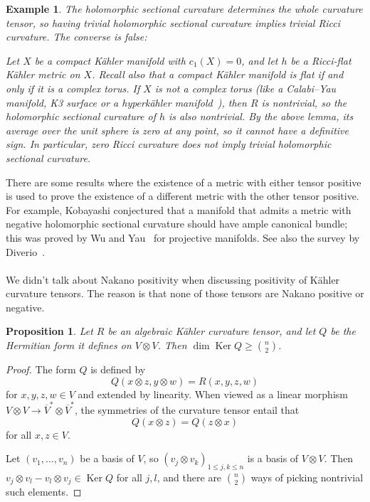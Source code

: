 \documentclass[10pt,a4paper]{article}
\newtheorem{prop}[theo]{Proposition}
\newtheorem{exam}[theo]{Example}
\newtheorem*{proof}{Proof}
\DeclareMathOperator{\Ker}{Ker}
\begin{document}
\begin{exam}
The holomorphic sectional curvature determines the whole curvature tensor, so having trivial holomorphic sectional curvature implies trivial Ricci curvature. The converse is false:

Let $X$ be a compact K\"ahler manifold with $c_1(X) = 0$, and let $h$ be a Ricci-flat K\"ahler metric on $X$. Recall also that a compact K\"ahler manifold is flat if and only if it is a complex torus. If $X$ is not a complex torus (like a Calabi--Yau manifold, K3 surface or a hyperk\"ahler manifold~\cite{beauville1983}), then $R$ is nontrivial, so the holomorphic sectional curvature of $h$ is also nontrivial. By the above lemma, its average over the unit sphere is zero at any point, so it cannot have a definitive sign. In particular, zero Ricci curvature does not imply trivial holomorphic sectional curvature.
\end{exam}

There are some results where the existence of a metric with either tensor positive is used to prove the existence of a different metric with the other tensor positive. For example, Kobayashi conjectured that a manifold that admits a metric with negative holomorphic sectional curvature should have ample canonical bundle; this was proved by Wu and Yau~\cite{wu2016negative} for projective manifolds. See also the survey by Diverio~\cite{diverio2020kobayashi}.



\paragraph{}
We didn't talk about Nakano positivity when discussing positivity of K\"ahler curvature tensors. The reason is that none of those tensors are Nakano positive or negative.

\begin{prop}
Let $R$ be an algebraic K\"ahler curvature tensor, and let $Q$ be the Hermitian form it defines on $V \otimes V$. Then $\dim \Ker Q \geq \binom n2$.
\end{prop}

\begin{proof}
The form $Q$ is defined by
$$
Q(x \otimes z, y \otimes w) = R(x,y,z,w)
$$
for $x,y,z,w \in V$ and extended by linearity. When viewed as a linear morphism $V \otimes V \to \overline V^* \otimes \overline V^*$, the symmetries of the curvature tensor entail that
$$
Q(x \otimes z) = Q(z \otimes x)
$$
for all $x, z \in V$.

Let $(v_1,\ldots,v_n)$ be a basis of $V$, so $(v_j \otimes v_k)_{1 \leq j,k \leq n}$ is a basis of $V \otimes V$. Then $v_j \otimes v_l - v_l \otimes v_j \in \Ker Q$ for all $j, l$, and there are $\binom n2$ ways of picking nontrivial such elements.
\end{proof}
\end{document}
